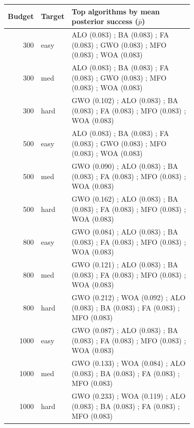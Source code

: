 \begin{tabular}{r l p{0.72\linewidth}}
\hline
Budget & Target & Top algorithms by mean posterior success ($\bar{p}$) \\
\hline
300 & easy & ALO (0.083) ; BA (0.083) ; FA (0.083) ; GWO (0.083) ; MFO (0.083) ; WOA (0.083) \\
300 & med & ALO (0.083) ; BA (0.083) ; FA (0.083) ; GWO (0.083) ; MFO (0.083) ; WOA (0.083) \\
300 & hard & GWO (0.102) ; ALO (0.083) ; BA (0.083) ; FA (0.083) ; MFO (0.083) ; WOA (0.083) \\
500 & easy & ALO (0.083) ; BA (0.083) ; FA (0.083) ; GWO (0.083) ; MFO (0.083) ; WOA (0.083) \\
500 & med & GWO (0.090) ; ALO (0.083) ; BA (0.083) ; FA (0.083) ; MFO (0.083) ; WOA (0.083) \\
500 & hard & GWO (0.162) ; ALO (0.083) ; BA (0.083) ; FA (0.083) ; MFO (0.083) ; WOA (0.083) \\
800 & easy & GWO (0.084) ; ALO (0.083) ; BA (0.083) ; FA (0.083) ; MFO (0.083) ; WOA (0.083) \\
800 & med & GWO (0.121) ; ALO (0.083) ; BA (0.083) ; FA (0.083) ; MFO (0.083) ; WOA (0.083) \\
800 & hard & GWO (0.212) ; WOA (0.092) ; ALO (0.083) ; BA (0.083) ; FA (0.083) ; MFO (0.083) \\
1000 & easy & GWO (0.087) ; ALO (0.083) ; BA (0.083) ; FA (0.083) ; MFO (0.083) ; WOA (0.083) \\
1000 & med & GWO (0.133) ; WOA (0.084) ; ALO (0.083) ; BA (0.083) ; FA (0.083) ; MFO (0.083) \\
1000 & hard & GWO (0.233) ; WOA (0.119) ; ALO (0.083) ; BA (0.083) ; FA (0.083) ; MFO (0.083) \\
\hline
\end{tabular}